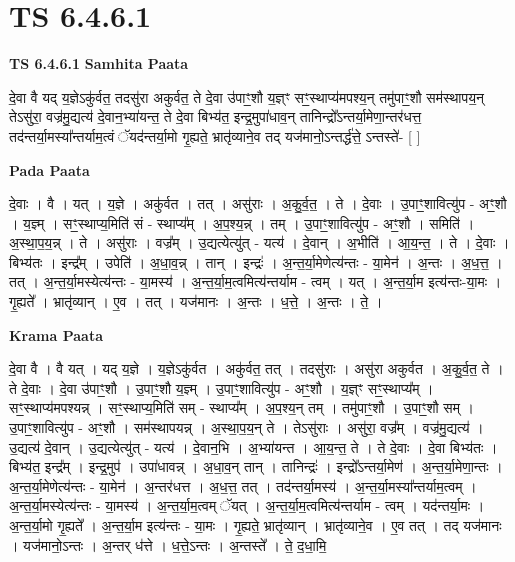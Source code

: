 \documentclass[17pt]{extarticle}
\begin{document}
\section{ TS 6.4.6.1 }

\textbf{TS 6.4.6.1 } \newline
\textbf{Samhita Paata} \newline

दे॒वा वै यद् य॒ज्ञेऽकु॑र्वत॒ तदसु॑रा अकुर्वत॒ ते दे॒वा उ॑पाꣳ॒॒शौ य॒ज्ञ्ꣳ सꣳ॒॒स्थाप्य॑मपश्य॒न् तमु॑पाꣳ॒॒शौ सम॑स्थापय॒न् तेऽसु॑रा॒ वज्र॑मु॒द्यत्य॑ दे॒वान॒भ्या॑यन्त॒ ते दे॒वा बिभ्य॑त॒ इन्द्र॒मुपा॑धाव॒न् तानिन्द्रो᳚ऽन्तर्या॒मेणा॒न्तर॑धत्त॒ तद॑न्तर्या॒मस्या᳚न्तर्याम॒त्वं ॅयद॑न्तर्या॒मो गृ॒ह्यते॒ भ्रातृ॑व्याने॒व तद् यज॑मानो॒ऽन्तर्द्ध॑त्ते॒ ऽन्तस्ते॑- [  ] \newline

\textbf{Pada Paata} \newline

दे॒वाः । वै । यत् । य॒ज्ञे । अकु॑र्वत । तत् । असु॑राः । अ॒कु॒र्व॒त॒ । ते । दे॒वाः । उ॒पाꣳ॒॒शावित्यु॑प - अꣳ॒॒शौ । य॒ज्ञ्म् । सꣳ॒॒स्थाप्य॒मिति॑ सं - स्थाप्य᳚म् । अ॒प॒श्य॒न्न् । तम् । उ॒पाꣳ॒॒शावित्यु॑प - अꣳ॒॒शौ । समिति॑ । अ॒स्था॒प॒य॒न्न् । ते । असु॑राः । वज्र᳚म् । उ॒द्यत्येत्यु॑त् - यत्य॑ । दे॒वान् । अ॒भीति॑ । आ॒य॒न्त॒ । ते । दे॒वाः । बिभ्य॑तः । इन्द्र᳚म् । उपेति॑ । अ॒धा॒व॒न्न् । तान् । इन्द्रः॑ । अ॒न्त॒र्या॒मेणेत्य॑न्तः - या॒मेन॑ । अ॒न्तः । अ॒ध॒त्त॒ । तत् । अ॒न्त॒र्या॒मस्येत्य॑न्तः - या॒मस्य॑ । अ॒न्त॒र्या॒म॒त्वमित्य॑न्तर्याम - त्वम् । यत् । अ॒न्त॒र्या॒म इत्य॑न्तः-या॒मः । गृ॒ह्यते᳚ । भ्रातृ॑व्यान् । ए॒व । तत् । यज॑मानः । अ॒न्तः । ध॒त्ते॒ । अ॒न्तः । ते॒ ।  \newline


\textbf{Krama Paata} \newline

दे॒वा वै । वै यत् । यद् य॒ज्ञे । य॒ज्ञेऽकु॑र्वत । अकु॑र्वत॒ तत् । तदसु॑राः । असु॑रा अकुर्वत । अ॒कु॒र्व॒त॒ ते । ते दे॒वाः । दे॒वा उ॑पाꣳ॒॒शौ । उ॒पाꣳ॒॒शौ य॒ज्ञ्म् । उ॒पाꣳ॒॒शावित्यु॑प - अꣳ॒॒शौ । य॒ज्ञ्ꣳ सꣳ॒॒स्थाप्य᳚म् । सꣳ॒॒स्थाप्य॑मपश्यन्न् । सꣳ॒॒स्थाप्य॒मिति॑ सम् - स्थाप्य᳚म् । अ॒प॒श्य॒न् तम् । तमु॑पाꣳ॒॒शौ । उ॒पाꣳ॒॒शौ सम् । उ॒पाꣳ॒॒शावित्यु॑प - अꣳ॒॒शौ । सम॑स्थापयन्न् । अ॒स्था॒प॒य॒न् ते । तेऽसु॑राः । असु॑रा॒ वज्र᳚म् । वज्र॑मु॒द्यत्य॑ । उ॒द्यत्य॑ दे॒वान् । उ॒द्यत्येत्यु॑त् - यत्य॑ । दे॒वान॒भि । अ॒भ्या॑यन्त । आ॒य॒न्त॒ ते । ते दे॒वाः । दे॒वा बिभ्य॑तः । बिभ्य॑त॒ इन्द्र᳚म् । इन्द्र॒मुप॑ । उपा॑धावन्न् । अ॒धा॒व॒न् तान् । तानिन्द्रः॑ । इन्द्रो᳚ऽन्तर्या॒मेण॑ । अ॒न्त॒र्या॒मेणा॒न्तः । अ॒न्त॒र्या॒मेणेत्य॑न्तः - या॒मेन॑ । अ॒न्तर॑धत्त । अ॒ध॒त्त॒ तत् । तद॑न्तर्या॒मस्य॑ । अ॒न्त॒र्या॒मस्या᳚न्तर्याम॒त्वम् । अ॒न्त॒र्या॒मस्येत्य॑न्तः - या॒मस्य॑ । अ॒न्त॒र्या॒म॒त्वम् ॅयत् । अ॒न्त॒र्या॒म॒त्वमित्य॑न्तर्याम - त्वम् । यद॑न्तर्या॒मः । अ॒न्त॒र्या॒मो गृ॒ह्यते᳚ । अ॒न्त॒र्या॒म इत्य॑न्तः - या॒मः । गृ॒ह्यते॒ भ्रातृ॑व्यान् । भ्रातृ॑व्याने॒व । ए॒व तत् । तद् यज॑मानः । यज॑मानो॒ऽन्तः । अ॒न्तर् ध॑त्ते । ध॒त्ते॒ऽन्तः । अ॒न्तस्ते᳚ । ते॒ द॒धा॒मि॒ \newline
\end{document}
